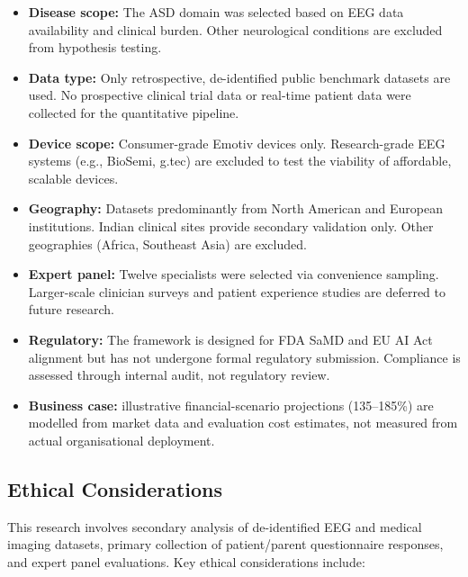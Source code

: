 \begin{itemize}[leftmargin=*, itemsep=3pt]
    \item \textbf{Disease scope:} The ASD domain was selected based on EEG data availability and clinical burden. Other neurological conditions are excluded from hypothesis testing.
    \item \textbf{Data type:} Only retrospective, de-identified public benchmark datasets are used. No prospective clinical trial data or real-time patient data were collected for the quantitative pipeline.
    \item \textbf{Device scope:} Consumer-grade Emotiv devices only. Research-grade EEG systems (e.g., BioSemi, g.tec) are excluded to test the viability of affordable, scalable devices.
    \item \textbf{Geography:} Datasets predominantly from North American and European institutions. Indian clinical sites provide secondary validation only. Other geographies (Africa, Southeast Asia) are excluded.
    \item \textbf{Expert panel:} Twelve specialists were selected via convenience sampling. Larger-scale clinician surveys and patient experience studies are deferred to future research.
    \item \textbf{Regulatory:} The framework is designed for FDA SaMD and EU AI Act alignment but has not undergone formal regulatory submission. Compliance is assessed through internal audit, not regulatory review.
    \item \textbf{Business case:} illustrative financial-scenario projections (135--185\%) are modelled from market data and evaluation cost estimates, not measured from actual organisational deployment.
\end{itemize}

\subsection{Ethical Considerations}
\label{sec:ethical_ch1}

This research involves secondary analysis of de-identified EEG and medical imaging datasets, primary collection of patient/parent questionnaire responses, and expert panel evaluations. Key ethical considerations include:

